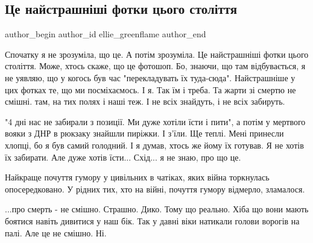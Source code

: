  
 
 
 
 
 
\subsection{Це найстрашніші фотки цього століття}
\label{sec:03_01_2023.fb.ellie_greenflame.1.foto}
 
\ifcmt
 author_begin
   author_id ellie_greenflame
 author_end
\fi

Спочатку я не зрозуміла, що це. А потім зрозуміла. Це найстрашніші фотки цього
століття. Може, хтось скаже, що це фотошоп. Бо, знаючи, що там відбувається, я
не уявляю, що у когось був час "перекладувать їх туда-сюда". Найстрашніше у цих
фотках те, що ми посміхаємось. І я. Так їм і треба. Та жарти зі смертю не
смішні. там, на тих полях і наші теж. І не всіх знайдуть, і не всіх забируть. 

"4 дні нас не забирали з позиції. Ми дуже хотіли їсти і пити", а потім у
мертвого вояки з ДНР в рюкзаку знайшли пиріжки. І з'їли. Ще теплі. Мені
принесли хлопці, бо я був самий голодний. І я думав, хтось же йому їх готував.
Я не хотів їх забирати. Але дуже хотів їсти... Схід... я не знаю, про що це.

Найкраще почуття гумору у цивільних в чатіках, яких війна торкнулась
опосередковано. У рідних тих, хто на війні, почуття гумору відмерло, зламалося. 

...про смерть - не смішно. Страшно. Дико. Тому що реально. Хіба що вони мають
боятися навіть дивитися у наш бік. Так у давні віки натикали голови ворогів на
палі. Але це не смішно. Ні.
